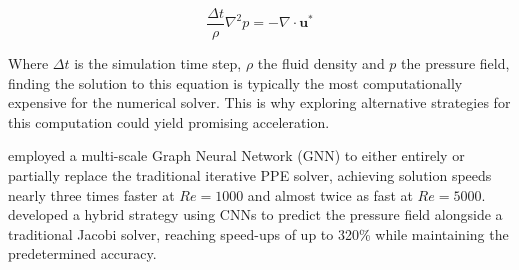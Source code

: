 \begin{equation}\label{eq: PPE}
    \frac{\Delta t}{\rho} \nabla^2 p = -\nabla \cdot \mathbf{u}^*
\end{equation}



Where $\Delta t$ is the simulation time step, $\rho$ the fluid density and $p$ the pressure field, finding the solution to this equation is typically the most computationally expensive for the numerical solver. This is why exploring alternative strategies for this computation could yield promising acceleration. 

\textcite{Chen2022} employed a multi-scale Graph Neural Network (GNN) to either entirely or partially replace the traditional iterative PPE solver, achieving solution speeds nearly three times faster at $Re=1000$ and almost twice as fast at $Re=5000$. \textcite{Ajuria2020} developed a hybrid strategy using CNNs to predict the pressure field alongside a traditional Jacobi solver, reaching speed-ups of up to 320\% while maintaining the predetermined accuracy. 

